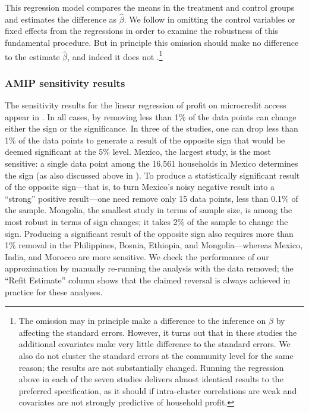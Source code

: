 This regression model compares the means in the treatment and control groups and
estimates the difference as $\hat{\beta}$. We follow
\citet{meager2019understanding} in omitting the control variables or fixed
effects from the regressions in order to examine the robustness of this
fundamental procedure. But in principle this omission should make no difference
to the estimate $\hat{\beta}$, and indeed it does not
\citep{meager2019understanding}.\footnote{The omission may in principle make a
difference to the inference on $\beta$ by affecting the standard errors.
However, it turns out that in these studies the additional covariates make very
little difference to the standard errors. We also do not cluster the standard
errors at the community level for the same reason; the results are not
substantially changed. Running the regression above in each of the seven studies
delivers almost identical results to the preferred specification, as it should
if intra-cluster correlations are weak and covariates are not strongly predictive
of household profit.}

\subsubsection{AMIP sensitivity results}
%
\MicrocreditProfitResultsTable{}
\MicrocreditTemptationResultsTable{}
%
The sensitivity results for the linear regression of profit on microcredit
access appear in . In all cases, by removing less
than 1\% of the data points can change either the sign or the significance. In
three of the studies, one can drop less than 1\% of the data points to generate
a result of the opposite sign that would be deemed significant at the 5\% level.
Mexico, the largest study, is the most sensitive: a single data point among the
16,561 households in Mexico determines the sign (as also discussed above in
). To produce a statistically significant result of
the opposite sign---that is, to turn Mexico's noisy negative result into a
``strong'' positive result---one need remove only 15 data points, less than
0.1\% of the sample. Mongolia, the smallest study in terms of sample size, is
among the most robust in terms of sign changes; it takes 2\% of the sample to
change the sign. Producing a significant result of the opposite sign also
requires more than 1\% removal in the Philippines, Bosnia, Ethiopia, and
Mongolia---whereas Mexico, India, and Morocco are more sensitive. We check the
performance of our approximation by manually re-running the analysis with the
data removed; the ``Refit Estimate'' column shows that the claimed reversal is
always achieved in practice for these analyses.

